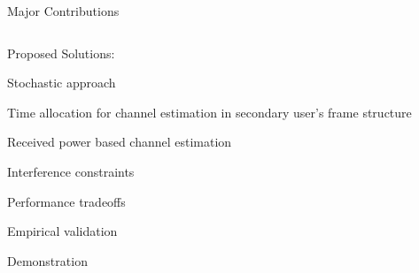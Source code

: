 \documentclass[16pt]{beamer}
\newcommand{\fs}[2]{\fontsize{#1 pt}{#2}\selectfont}
\begin{document}
\begin{frame}[t]{Major Contributions}
\begin{columns}
		\begin{column}[t]{0.44\columnwidth}
			\centering Proposed Solutions: \\[-0.2em]
			\fs{8}{8}
			\begin{block}{}
				\centering
			  	Stochastic approach%
			\end{block}
			\vspace{-0.5mm}
			\begin{block}{}
				\centering
			   	Time allocation for channel estimation in secondary user's frame structure
			\end{block}
			\vspace{-0.5mm}
			\onslide<2->
			{
			\begin{block}{}
				\centering
				Received power based channel estimation
			\end{block}
			}
			\vspace{7.0mm}
			\onslide<3->
			{
			\begin{block}{}
				\centering
			  	Interference constraints  %
			\end{block}
			}	
			\vspace{-0.5mm}
			\onslide<3->
			{
			\begin{block}{}
				\centering
			 	Performance tradeoffs %
			\end{block}
			}
			\vspace{-0.5mm}
			\onslide<4->
			{
			\begin{block}{}
				\centering
				Empirical validation 
			\end{block}
			\vspace{-0.5mm}
			\onslide<4->
			\begin{block}{}
				\centering
				Demonstration
			\end{block}
			}
		\end{column}
	\end{columns}
\end{frame}
\end{document}
